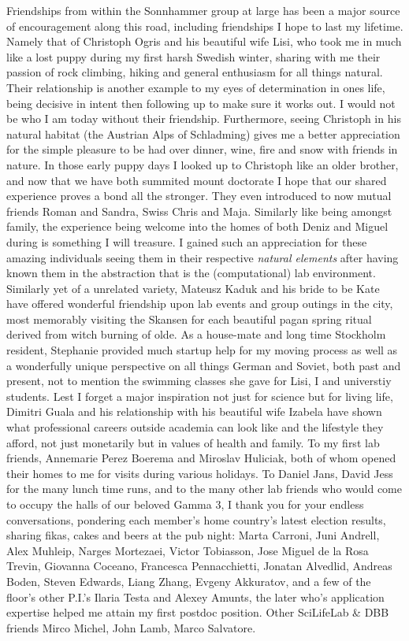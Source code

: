 Friendships from within the Sonnhammer group at large has been a major source of encouragement along this road, including friendships I hope to last my lifetime. Namely that of Christoph Ogris and his beautiful wife Lisi, who took me in much like a lost puppy during my first harsh Swedish winter, sharing with me their passion of rock climbing, hiking and general enthusiasm for all things natural. Their relationship is another example to my eyes of determination in ones life, being decisive in intent then following up to make sure it works out. I would not be who I am today without their friendship. Furthermore, seeing Christoph in his natural habitat (the Austrian Alps of Schladming) gives me a better appreciation for the simple pleasure to be had over dinner, wine, fire and snow with friends in nature. In those early puppy days I looked up to Christoph like an older brother, and now that we have both summited mount doctorate I hope that our shared experience proves a bond all the stronger. They even introduced to now mutual friends Roman and Sandra, Swiss Chris and Maja. Similarly like being amongst family, the experience being welcome into the homes of both Deniz and Miguel during is something I will treasure. I gained such an appreciation for these amazing individuals seeing them in their respective \emph{natural elements} after having known them in the abstraction that is the (computational) lab environment. Similarly yet of a unrelated variety, Mateusz Kaduk and his bride to be Kate have offered wonderful friendship upon lab events and group outings in the city, most memorably visiting the Skansen for each beautiful pagan spring ritual derived from witch burning of olde. As a house-mate and long time Stockholm resident, Stephanie provided much startup help for my moving process as well as a wonderfully unique perspective on all things German and Soviet, both past and present, not to mention the swimming classes she gave for Lisi, I and universtiy students. Lest I forget a major inspiration not just for science but for living life, Dimitri Guala and his relationship with his beautiful wife Izabela have shown what professional careers outside academia can look like and the lifestyle they afford, not just monetarily but in values of health and family. 
To my first lab friends, Annemarie Perez Boerema and Miroslav Huliciak, both of whom opened their homes to me for visits during various holidays. To Daniel Jans, David Jess for the many lunch time runs, and to the many other lab friends who would come to occupy the halls of our beloved Gamma 3, I thank you for your endless conversations, pondering each member's home country's latest election results, sharing fikas, cakes and beers at the pub night: Marta Carroni, Juni Andrell, Alex Muhleip, Narges Mortezaei, Victor Tobiasson, Jose Miguel de la Rosa Trevin, Giovanna Coceano, Francesca Pennacchietti, Jonatan Alvedlid, Andreas Boden, Steven Edwards, Liang Zhang, Evgeny Akkuratov, and a few of the floor's other P.I.'s Ilaria Testa and Alexey Amunts, the later who's application expertise helped me attain my first postdoc position. Other SciLifeLab \& DBB friends Mirco Michel, John Lamb, Marco Salvatore. 

